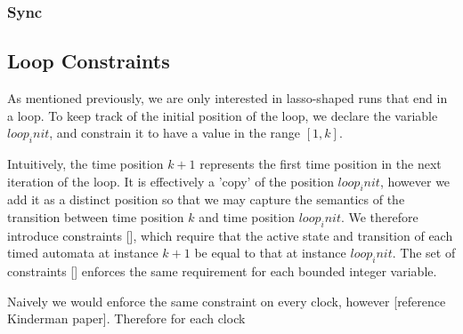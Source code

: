 \documentclass[a4paper,11pt]{article}
\begin{document}
\subsubsection{Sync}
\label{sec:org6c5e3f4}
\subsection{Loop Constraints}
\label{sec:org7c564a5}

As mentioned previously, we are only interested in lasso-shaped runs that end in
a loop. To keep track of the initial position of the loop, we declare the
variable \(loop_init\), and constrain it to have a value in the range \([1,k]\).

Intuitively, the time position \(k+1\) represents the first time position in the
next iteration of the loop. It is effectively a 'copy' of the position
\(loop_init\), however we add it as a distinct position so that we may capture
the semantics of the transition between time position \(k\) and time position
\(loop_init\). We therefore introduce constraints [], which require that the
active state and transition of each timed automata at instance \(k+1\) be equal
to that at instance \(loop_init\). The set of constraints [] enforces the same
requirement for each bounded integer variable.

Naively we would enforce the same constraint on every clock, however [reference
Kinderman paper]. Therefore for each clock
\end{document}
